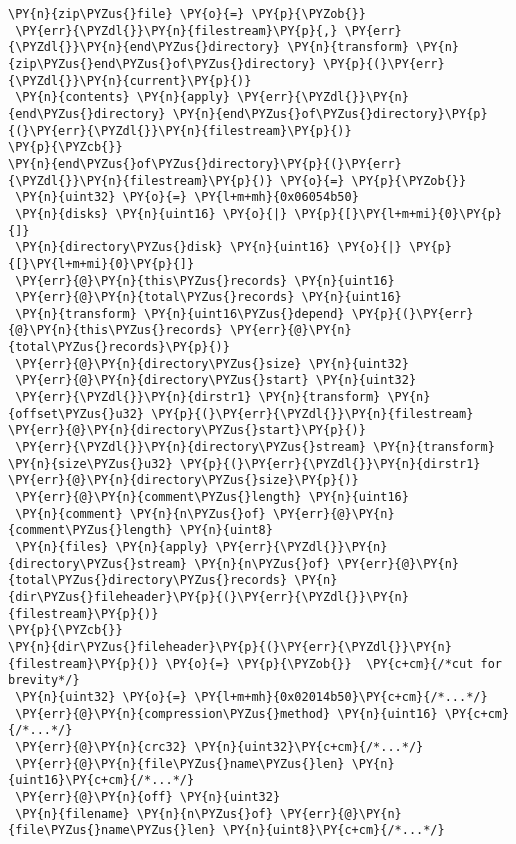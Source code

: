 \begin{Verbatim}[commandchars=\\\{\},codes={\catcode`\$=3\catcode`\^=7\catcode`\_=8}]
\PY{n}{zip\PYZus{}file} \PY{o}{=} \PY{p}{\PYZob{}} 
 \PY{err}{\PYZdl{}}\PY{n}{filestream}\PY{p}{,} \PY{err}{\PYZdl{}}\PY{n}{end\PYZus{}directory} \PY{n}{transform} \PY{n}{zip\PYZus{}end\PYZus{}of\PYZus{}directory} \PY{p}{(}\PY{err}{\PYZdl{}}\PY{n}{current}\PY{p}{)}
 \PY{n}{contents} \PY{n}{apply} \PY{err}{\PYZdl{}}\PY{n}{end\PYZus{}directory} \PY{n}{end\PYZus{}of\PYZus{}directory}\PY{p}{(}\PY{err}{\PYZdl{}}\PY{n}{filestream}\PY{p}{)}
\PY{p}{\PYZcb{}}
\PY{n}{end\PYZus{}of\PYZus{}directory}\PY{p}{(}\PY{err}{\PYZdl{}}\PY{n}{filestream}\PY{p}{)} \PY{o}{=} \PY{p}{\PYZob{}} 
 \PY{n}{uint32} \PY{o}{=} \PY{l+m+mh}{0x06054b50}
 \PY{n}{disks} \PY{n}{uint16} \PY{o}{|} \PY{p}{[}\PY{l+m+mi}{0}\PY{p}{]}
 \PY{n}{directory\PYZus{}disk} \PY{n}{uint16} \PY{o}{|} \PY{p}{[}\PY{l+m+mi}{0}\PY{p}{]}
 \PY{err}{@}\PY{n}{this\PYZus{}records} \PY{n}{uint16}
 \PY{err}{@}\PY{n}{total\PYZus{}records} \PY{n}{uint16} 
 \PY{n}{transform} \PY{n}{uint16\PYZus{}depend} \PY{p}{(}\PY{err}{@}\PY{n}{this\PYZus{}records} \PY{err}{@}\PY{n}{total\PYZus{}records}\PY{p}{)}
 \PY{err}{@}\PY{n}{directory\PYZus{}size} \PY{n}{uint32} 
 \PY{err}{@}\PY{n}{directory\PYZus{}start} \PY{n}{uint32}
 \PY{err}{\PYZdl{}}\PY{n}{dirstr1} \PY{n}{transform} \PY{n}{offset\PYZus{}u32} \PY{p}{(}\PY{err}{\PYZdl{}}\PY{n}{filestream} \PY{err}{@}\PY{n}{directory\PYZus{}start}\PY{p}{)} 
 \PY{err}{\PYZdl{}}\PY{n}{directory\PYZus{}stream} \PY{n}{transform} \PY{n}{size\PYZus{}u32} \PY{p}{(}\PY{err}{\PYZdl{}}\PY{n}{dirstr1} \PY{err}{@}\PY{n}{directory\PYZus{}size}\PY{p}{)}
 \PY{err}{@}\PY{n}{comment\PYZus{}length} \PY{n}{uint16}
 \PY{n}{comment} \PY{n}{n\PYZus{}of} \PY{err}{@}\PY{n}{comment\PYZus{}length} \PY{n}{uint8}
 \PY{n}{files} \PY{n}{apply} \PY{err}{\PYZdl{}}\PY{n}{directory\PYZus{}stream} \PY{n}{n\PYZus{}of} \PY{err}{@}\PY{n}{total\PYZus{}directory\PYZus{}records} \PY{n}{dir\PYZus{}fileheader}\PY{p}{(}\PY{err}{\PYZdl{}}\PY{n}{filestream}\PY{p}{)}
\PY{p}{\PYZcb{}}
\PY{n}{dir\PYZus{}fileheader}\PY{p}{(}\PY{err}{\PYZdl{}}\PY{n}{filestream}\PY{p}{)} \PY{o}{=} \PY{p}{\PYZob{}}  \PY{c+cm}{/*cut for brevity*/}
 \PY{n}{uint32} \PY{o}{=} \PY{l+m+mh}{0x02014b50}\PY{c+cm}{/*...*/}
 \PY{err}{@}\PY{n}{compression\PYZus{}method} \PY{n}{uint16} \PY{c+cm}{/*...*/}
 \PY{err}{@}\PY{n}{crc32} \PY{n}{uint32}\PY{c+cm}{/*...*/}
 \PY{err}{@}\PY{n}{file\PYZus{}name\PYZus{}len} \PY{n}{uint16}\PY{c+cm}{/*...*/}
 \PY{err}{@}\PY{n}{off} \PY{n}{uint32}
 \PY{n}{filename} \PY{n}{n\PYZus{}of} \PY{err}{@}\PY{n}{file\PYZus{}name\PYZus{}len} \PY{n}{uint8}\PY{c+cm}{/*...*/}

\end{Verbatim}
